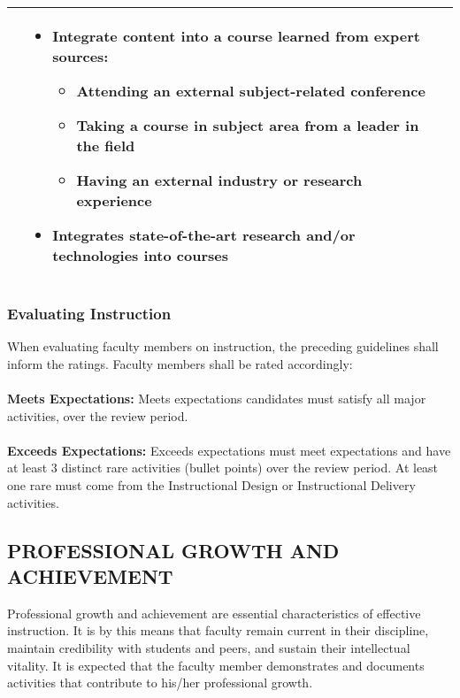 \documentclass{scrartcl}
\begin{document}
\begin{longtable}{p{2cm}p{6cm}P{6cm}}
\begin{itemize}[noitemsep,leftmargin=*,topsep=0pt,partopsep=0pt]
    \end{itemize}
  & %
    \begin{itemize}[noitemsep,leftmargin=*,topsep=0pt,partopsep=0pt]
        \item Integrate content into a course learned from expert sources:
        		\begin{itemize}
		\item Attending an external  subject-related
 conference
 		\item Taking a course in subject area from a leader in the field
		\item Having an external industry or research experience
		\end{itemize}
        \item Integrates state-of-the-art research and/or technologies into courses
     \end{itemize}\\ 
\hline
\end{longtable}

\subsubsection{Evaluating Instruction}

When evaluating faculty members on instruction, the preceding guidelines shall inform the ratings. Faculty members shall be rated accordingly:
\\\\
\textbf{Meets Expectations:} Meets expectations candidates must satisfy all major activities, over the review period.
\\\\
\textbf{Exceeds Expectations:} Exceeds expectations must meet expectations and have at least 3 distinct rare activities (bullet points) over the review period. At least one rare must come from the Instructional Design or Instructional Delivery activities.

\subsection{PROFESSIONAL GROWTH AND ACHIEVEMENT}

Professional growth and achievement are essential characteristics of effective instruction. It is by this means that faculty remain current in their discipline, maintain credibility with students and peers, and sustain their intellectual vitality. It is expected that the faculty member demonstrates and documents activities that contribute to his/her professional growth.
\end{document}
